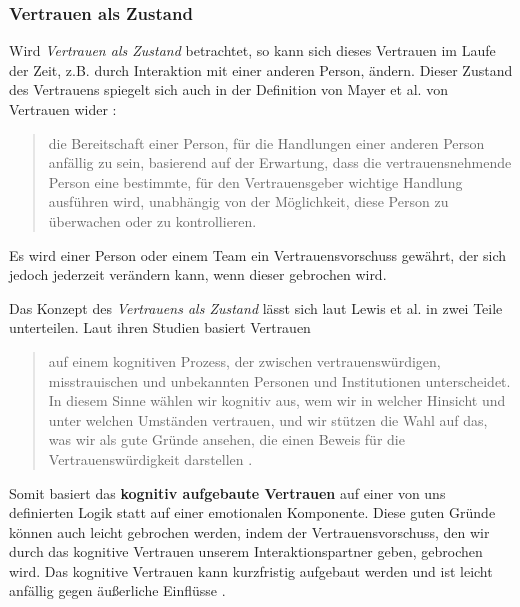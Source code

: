 \documentclass[a4paper,11pt]{article}%
\renewcommand{\\}{\vspace*{0.5\baselineskip} \newline}
\begin{document}
{\subsubsection{Vertrauen als Zustand}
\label{Vertrauen als Zustand-Label}
Wird \textit{Vertrauen als Zustand} betrachtet, so kann sich dieses Vertrauen im Laufe der Zeit, z.B. durch Interaktion mit einer anderen Person, ändern. Dieser Zustand des Vertrauens spiegelt sich auch in der Definition von Mayer et al. von Vertrauen wider \citep[S. 712]{mayer1995integrative}:
\begin{quote}
\glqq{}die Bereitschaft einer Person, für die Handlungen einer anderen Person anfällig zu sein, basierend auf der Erwartung, dass die vertrauensnehmende Person eine bestimmte, für den Vertrauensgeber wichtige Handlung ausführen wird, unabhängig von der Möglichkeit, diese Person zu überwachen oder zu kontrollieren.\dq{}
\end{quote}
Es wird einer Person oder einem Team ein Vertrauensvorschuss gewährt, der sich jedoch jederzeit verändern kann, wenn dieser gebrochen wird.

Das Konzept des \textit{Vertrauens als Zustand} lässt sich laut Lewis et al. \citep[S. 970-971]{lewis1985trust} in zwei Teile unterteilen.
Laut ihren Studien basiert Vertrauen 

\begin{quote}
\glqq{}auf einem kognitiven Prozess, der zwischen vertrauenswürdigen, misstrauischen und unbekannten Personen und Institutionen unterscheidet. In diesem Sinne wählen wir kognitiv aus, wem wir in welcher Hinsicht und unter welchen Umständen vertrauen, und wir stützen die Wahl auf das, was wir als \glqq{}gute Gründe\grqq{} ansehen, die einen Beweis für die Vertrauenswürdigkeit darstellen\grqq{} \citep[S. 970]{lewis1985trust}.
\end{quote}

Somit basiert das \textbf{kognitiv aufgebaute Vertrauen} auf einer von uns definierten Logik statt auf einer emotionalen Komponente. Diese \glqq{}guten Gründe\dq{} können auch leicht gebrochen werden, indem der Vertrauensvorschuss, den wir durch das kognitive Vertrauen unserem Interaktionspartner geben, gebrochen wird.
Das kognitive Vertrauen kann kurzfristig aufgebaut werden und ist leicht anfällig gegen äußerliche Einflüsse \citep[S. 970]{lewis1985trust}. 

}
\end{document}
